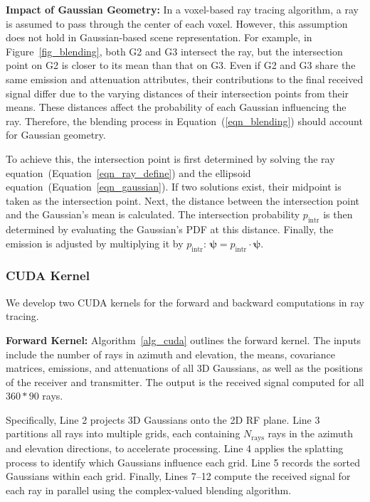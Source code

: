 \textbf{Impact of Gaussian Geometry:}  
In a voxel-based ray tracing algorithm, a ray is assumed to pass through the center of each voxel.  
However, this assumption does not hold in Gaussian-based scene representation.  
For example, in Figure~\ref{fig_blending}, both G2 and G3 intersect the ray, but the intersection point on G2 is closer to its mean than that on G3.  
Even if G2 and G3 share the same emission and attenuation attributes, their contributions to the final received signal differ due to the varying distances of their intersection points from their means.  
These distances affect the probability of each Gaussian influencing the ray.  
Therefore, the blending process in Equation~(\ref{eqn_blending}) should account for Gaussian geometry.




To achieve this, the intersection point is first determined by solving the ray equation~(Equation~\ref{eqn_ray_define}) and the ellipsoid equation~(Equation~\ref{eqn_gaussian}).  
If two solutions exist, their midpoint is taken as the intersection point.  
Next, the distance between the intersection point and the Gaussian’s mean is calculated.  
The intersection probability \(p_{\text{intr}}\) is then determined by evaluating the Gaussian’s PDF at this distance.
Finally, the emission is adjusted by multiplying it by \(p_{\text{intr}}\): \(\boldsymbol{\psi} = p_{\text{intr}} \cdot \boldsymbol{\psi}\).




\subsubsection{CUDA Kernel}
We develop two CUDA kernels for the forward and backward computations in ray tracing.


\textbf{Forward Kernel:}  
Algorithm~\ref{alg_cuda} outlines the forward kernel.  
The inputs include the number of rays in azimuth and elevation, the means, covariance matrices, emissions, and attenuations of all 3D Gaussians, as well as the positions of the receiver and transmitter.  
The output is the received signal computed for all \(360 * 90\) rays.



Specifically, Line 2 projects 3D Gaussians onto the 2D RF plane.  
Line 3 partitions all rays into multiple grids, each containing \(N_{\text{rays}}\) rays in the azimuth and elevation directions, to accelerate processing.  
Line 4 applies the splatting process to identify which Gaussians influence each grid.  
Line 5 records the sorted Gaussians within each grid.  
Finally, Lines 7–12 compute the received signal for each ray in parallel using the complex-valued blending algorithm.



